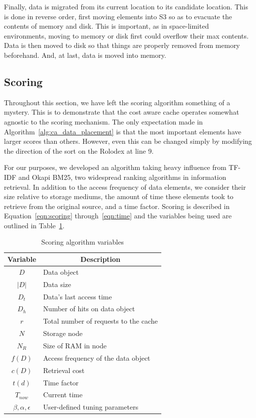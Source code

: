 Finally, data is migrated from its current location to its candidate location.
This is done in reverse order, first moving elements into S3 so as to
evacuate the contents of memory and disk. This is important, as in
space-limited environments, moving to memory or disk first could overflow their
max contents. Data is then moved to disk so that things are properly removed
from memory beforehand. And, at last, data is moved into memory.

\subsection{Scoring} %
\label{sub:ca_scoring}
Throughout this section, we have left the scoring algorithm something of a
mystery. This is to demonstrate that the cost aware cache operates somewhat
agnostic to the scoring mechanism. The only expectation made in
Algorithm~\ref{alg:ca_data_placement} is that the most important elements have
larger scores than others. However, even this can be changed simply by
modifying the direction of the sort on the Rolodex at line 9.

For our purposes, we developed an algorithm taking heavy influence from TF-IDF
and Okapi BM25\cite{tfidf,bm25}, two widespread ranking algorithms in
information retrieval. In addition to the access frequency of data elements, we
consider their size relative to storage mediums, the amount of time these
elements took to retrieve from the original source, and a time factor. Scoring
is described in Equation~\ref{eqn:scoring} through~\ref{eqn:time} and the
variables being used are outlined in Table~\ref{tab:scoring_variables}.

\begin{table}[htp]
  \begin{center}
    \begin{tabular}{|c|l|}
      \hline
      \multicolumn{1}{|c}{\textbf{Variable}} &
      \multicolumn{1}{|c|}{\textbf{Description}}\\
      \hline
				$D$ & Data object\\
				$|D|$ & Data size\\
				$D_t$ & Data's last access time\\
				$D_h$ & Number of hits on data object\\
				$r$ & Total number of requests to the cache\\
				$N$ & Storage node\\
				$N_R$ & Size of RAM in node\\
				$f(D)$ & Access frequency of the data object\\
				$c(D)$ & Retrieval cost\\
				$t(d)$ & Time factor\\
				$T_{now}$ & Current time\\
				$\beta,\alpha,\epsilon$ & User-defined tuning parameters\\
      \hline
    \end{tabular}
    \caption{Scoring algorithm variables}
    \label{tab:scoring_variables}
  \end{center}
\end{table}

